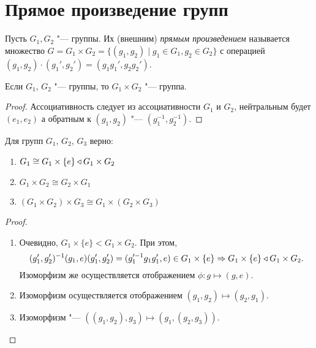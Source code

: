 \documentclass[main]{subfiles}
\begin{document}
\section{Прямое произведение групп}
\begin{definition}
  Пусть \( G_1, G_2 \) "--- группы.
  Их (внешним) \emph{прямым произведением}
  называется множество \( G = G_1 \times G_2 =
  \{ (g_1, g_2) \mid g_1 \in G_1, g_2 \in G_2 \} \)
  с операцией \( (g_1, g_2) \cdot (g_1', g_2') =
  (g_1 g_1', g_2 g_2') \).
\end{definition}

\begin{proposition}
  Если \( G_1 \), \( G_2 \) "--- группы,
  то \( G_1 \times G_2 \) "--- группа.
\end{proposition}
\begin{proof}
  Ассоциативность следует из ассоциативности \( G_1 \)
  и \( G_2 \), нейтральным будет \( (e_1, e_2) \) а
  обратным к \( (g_1, g_2) \) "--- \( (g_1^{-1}, g_2^{-1}) \).
\end{proof}

\begin{proposition}
  Для групп \( G_1 \), \( G_2 \), \( G_3 \) верно:
  \begin{enumerate}
    \item \( G_1 \cong G_1 \times \{ e \} \triangleleft G_1 \times G_2 \)
    \item \( G_1 \times G_2 \cong G_2 \times G_1 \)
    \item \( (G_1 \times G_2) \times G_3 \cong
      G_1 \times (G_2 \times G_3) \)
  \end{enumerate}
\end{proposition}
\begin{proof}~
  \begin{enumerate}
    \item Очевидно, \( G_1 \times \{ e \} < G_1 \times G_2 \).
      При этом,
      \[
	(g_1', g_2')^{-1} (g_1, e) (g_1', g_2') =
	(g_1'^{-1} g_1 g_1', e) \in G_1 \times \{ e \}
	\Rightarrow
	G_1 \times \{ e \} \triangleleft G_1 \times G_2.
      \]
      Изоморфизм же осуществляется отображением
      \( \phi : g \mapsto (g, e) \).
    \item Изоморфизм осуществляется отображением
      \( (g_1, g_2) \mapsto (g_2, g_1) \).
    \item Изоморфизм "---
      \( ((g_1, g_2), g_3) \mapsto (g_1, (g_2, g_3)) \).
      \qedhere
  \end{enumerate}
\end{proof}
\end{document}
